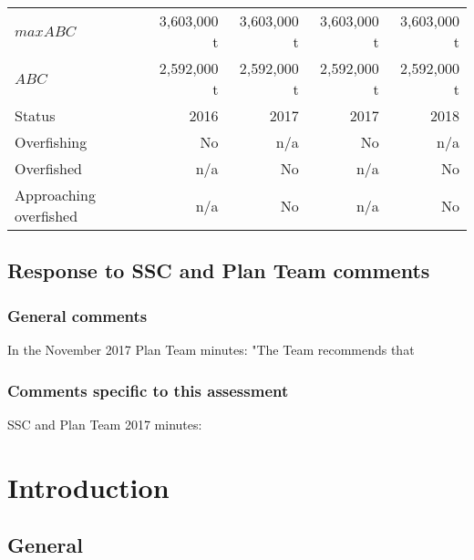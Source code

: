 \documentclass[11pt,]{article}
\begin{document}
\begin{table}[ht]
\begin{tabular}{lrr|rr}
$maxABC$                              &  3,603,000 t &  3,603,000 t &  3,603,000 t & 3,603,000 t \\
$ABC$                                 &  2,592,000 t &  2,592,000 t & 2,592,000 t & 2,592,000 t \\
\hline
Status                               & 2016       & 2017       &  2017             & 2018          \\
\hline
Overfishing                           & No         & n/a       & No                        & n/a                 \\
Overfished                           & n/a         & No       & n/a                        & No                  \\
Approaching overfished               & n/a         & No       & n/a                        & No                  \\
\hline
\end{tabular}
\end{table}

\hypertarget{response-to-ssc-and-plan-team-comments}{%
\subsection{Response to SSC and Plan Team
comments}\label{response-to-ssc-and-plan-team-comments}}

\hypertarget{general-comments}{%
\subsubsection{General comments}\label{general-comments}}

In the November 2017 Plan Team minutes: "The Team recommends that

\hypertarget{comments-specific-to-this-assessment}{%
\subsubsection{Comments specific to this
assessment}\label{comments-specific-to-this-assessment}}

SSC and Plan Team 2017 minutes:

\hypertarget{introduction}{%
\section{Introduction}\label{introduction}}

\hypertarget{general}{%
\subsection{General}\label{general}}
\end{document}
